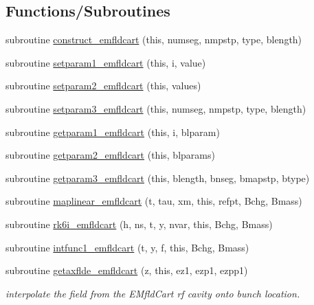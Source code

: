 \subsection*{Functions/\+Subroutines}
\begin{DoxyCompactItemize}
\item 
subroutine \mbox{\hyperlink{namespaceemfldcartclass_a22c8117844df69d19834c91595060930}{construct\+\_\+emfldcart}} (this, numseg, nmpstp, type, blength)
\item 
subroutine \mbox{\hyperlink{namespaceemfldcartclass_a667f3b95239a56c59438d7645e902471}{setparam1\+\_\+emfldcart}} (this, i, value)
\item 
subroutine \mbox{\hyperlink{namespaceemfldcartclass_a49c36692c057476c17ea403564e4f057}{setparam2\+\_\+emfldcart}} (this, values)
\item 
subroutine \mbox{\hyperlink{namespaceemfldcartclass_a1091548d2fbca6e19b3861f96b834bfc}{setparam3\+\_\+emfldcart}} (this, numseg, nmpstp, type, blength)
\item 
subroutine \mbox{\hyperlink{namespaceemfldcartclass_ab81f3e948555a34e9f3e6dd08fb8d7c8}{getparam1\+\_\+emfldcart}} (this, i, blparam)
\item 
subroutine \mbox{\hyperlink{namespaceemfldcartclass_a0e3252de98b5d0c5318b5cdccb878b21}{getparam2\+\_\+emfldcart}} (this, blparams)
\item 
subroutine \mbox{\hyperlink{namespaceemfldcartclass_af5ef093e045d499ae731aad8612e6333}{getparam3\+\_\+emfldcart}} (this, blength, bnseg, bmapstp, btype)
\item 
subroutine \mbox{\hyperlink{namespaceemfldcartclass_a4be4286a2e0f37f64d5fd1973fe73f39}{maplinear\+\_\+emfldcart}} (t, tau, xm, this, refpt, Bchg, Bmass)
\item 
subroutine \mbox{\hyperlink{namespaceemfldcartclass_a2d6f42bcd880ec225920c8179e292af6}{rk6i\+\_\+emfldcart}} (h, ns, t, y, nvar, this, Bchg, Bmass)
\item 
subroutine \mbox{\hyperlink{namespaceemfldcartclass_a2a33c1d59a306651080d563b98b844e7}{intfunc1\+\_\+emfldcart}} (t, y, f, this, Bchg, Bmass)
\item 
subroutine \mbox{\hyperlink{namespaceemfldcartclass_a98959709716076ee10dea98be7a2243c}{getaxflde\+\_\+emfldcart}} (z, this, ez1, ezp1, ezpp1)
\begin{DoxyCompactList}\small\item\em interpolate the field from the E\+Mfld\+Cart rf cavity onto bunch location. \end{DoxyCompactList}\item 

\end{DoxyCompactItemize}
